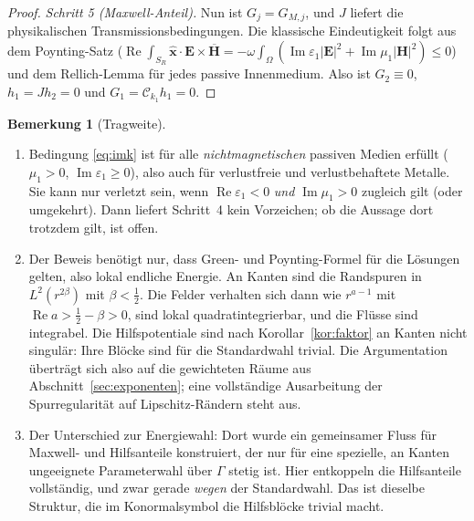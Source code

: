 \documentclass[11pt, a4paper]{article}
\newcommand{\mvec}[1]{\boldsymbol{#1}}
\newcommand{\xh}{\hat{\mvec{x}}}
\theoremstyle{plain}
\theoremstyle{definition}
\newtheorem{bemerkung}[satz]{Bemerkung}
\begin{document}
\begin{proof}
\emph{Schritt 5 (Maxwell-Anteil).} Nun ist $G_j=G_{M,j}$, und $J$ liefert die
physikalischen Transmissionsbedingungen. Die klassische Eindeutigkeit folgt aus dem
Poynting-Satz ($\operatorname{Re}\int_{S_R}\xh\cdot\mvec{E}\times\overline{\mvec{H}}
= -\omega\int_\Omega(\operatorname{Im}\varepsilon_1|\mvec{E}|^2+\operatorname{Im}\mu_1|\mvec{H}|^2)\le0$)
und dem Rellich-Lemma für jedes passive Innenmedium. Also ist $G_2\equiv0$,
$h_1=Jh_2=0$ und $G_1=\mathcal{C}_{k_1}h_1=0$.
\end{proof}

\begin{bemerkung}[Tragweite]\label{bem:eindstd}
\begin{enumerate}[leftmargin=*]
  \item Bedingung \eqref{eq:imk} ist für alle \emph{nichtmagnetischen} passiven
    Medien erfüllt ($\mu_1>0$, $\operatorname{Im}\varepsilon_1\ge0$), also auch für
    verlustfreie und verlustbehaftete Metalle. Sie kann nur verletzt sein, wenn
    $\operatorname{Re}\varepsilon_1<0$ \emph{und} $\operatorname{Im}\mu_1>0$ zugleich
    gilt (oder umgekehrt). Dann liefert Schritt~4 kein Vorzeichen; ob die Aussage
    dort trotzdem gilt, ist offen.
  \item Der Beweis benötigt nur, dass Green- und Poynting-Formel für die
    Lösungen gelten, also lokal endliche Energie. An Kanten sind die Randspuren in
    $L^2(r^{2\beta})$ mit $\beta<\tfrac12$. Die Felder verhalten sich dann wie
    $r^{a-1}$ mit $\operatorname{Re}a>\tfrac12-\beta>0$, sind lokal quadratintegrierbar,
    und die Flüsse sind integrabel. Die Hilfspotentiale sind nach
    Korollar~\ref{kor:faktor} an Kanten nicht singulär: Ihre Blöcke sind für die
    Standardwahl trivial. Die Argumentation überträgt sich also auf die gewichteten
    Räume aus Abschnitt~\ref{sec:exponenten}; eine vollständige Ausarbeitung der
    Spurregularität auf Lipschitz-Rändern steht aus.
  \item Der Unterschied zur Energiewahl: Dort wurde ein gemeinsamer Fluss für Maxwell-
    und Hilfsanteile konstruiert, der nur für eine spezielle, an Kanten ungeeignete
    Parameterwahl über $\Gamma$ stetig ist. Hier entkoppeln die Hilfsanteile
    vollständig, und zwar gerade \emph{wegen} der Standardwahl. Das ist dieselbe
    Struktur, die im Konormalsymbol die Hilfsblöcke trivial macht.
\end{enumerate}
\end{bemerkung}
\end{document}
